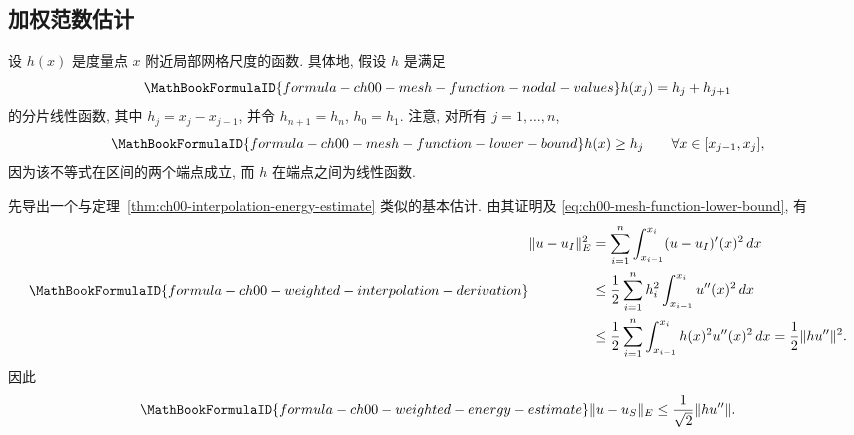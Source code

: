 \subsection{加权范数估计}
\label{sec:ch00-weighted-norm-estimates}

设 $h(x)$ 是度量点 $x$ 附近局部网格尺度的函数. 具体地, 假设 $h$ 是满足
\[
\MathBookFormulaID{formula-ch00-mesh-function-nodal-values}
h(x_j)=h_j+h_{j+1}
\]
的分片线性函数, 其中 $h_j=x_j-x_{j-1}$, 并令 $h_{n+1}=h_n$, $h_0=h_1$. 注意, 对所有 $j=1,\ldots,n$,
\setcounter{equation}{0}
\begin{equation}
\MathBookFormulaID{formula-ch00-mesh-function-lower-bound}
h(x)\geq h_j\qquad\forall x\in[x_{j-1},x_j],
\label{eq:ch00-mesh-function-lower-bound}
\end{equation}
因为该不等式在区间的两个端点成立, 而 $h$ 在端点之间为线性函数.

先导出一个与定理~\ref{thm:ch00-interpolation-energy-estimate} 类似的基本估计. 由其证明及 \eqref{eq:ch00-mesh-function-lower-bound}, 有
\[
\MathBookFormulaID{formula-ch00-weighted-interpolation-derivation}
\begin{aligned}
\|u-u_I\|_E^2
&=\sum_{i=1}^n\int_{x_{i-1}}^{x_i}(u-u_I)'(x)^2\,dx\\
&\leq\frac12\sum_{i=1}^nh_i^2\int_{x_{i-1}}^{x_i}u''(x)^2\,dx\\
&\leq\frac12\sum_{i=1}^n\int_{x_{i-1}}^{x_i}h(x)^2u''(x)^2\,dx
=\frac12\|hu''\|^2.
\end{aligned}
\]
因此
\begin{equation}
\MathBookFormulaID{formula-ch00-weighted-energy-estimate}
\|u-u_S\|_E\leq\frac1{\sqrt2}\|hu''\|.
\label{eq:ch00-weighted-energy-estimate}
\end{equation}

